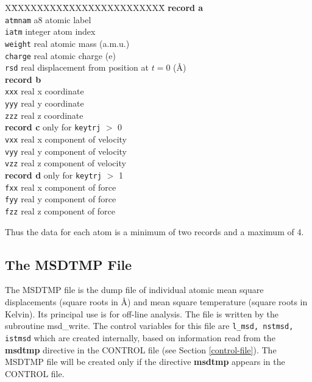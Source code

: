 \begin{tabbing}
X\=XXXXXXXX\=XXXXXXXXXXXXXXXX\=\kill
{\bf record a} \\
\> {\tt atmnam} \> a8      \> atomic label \\
\> {\tt iatm}   \> integer \> atom index \\
\> {\tt weight} \> real    \> atomic mass (a.m.u.) \\
\> {\tt charge} \> real    \> atomic charge (e) \\
\> {\tt rsd}    \> real    \> displacement from position at $t=0$ (\AA)\\
{\bf record b} \\
\> {\tt xxx}    \> real    \> x coordinate \\
\> {\tt yyy}    \> real    \> y coordinate \\
\> {\tt zzz}    \> real    \> z coordinate \\
{\bf record c} only for {\tt keytrj} $>$ 0 \\
\> {\tt vxx}    \> real    \> x component of velocity \\
\> {\tt vyy}    \> real    \> y component of velocity \\
\> {\tt vzz}    \> real    \> z component of velocity \\
{\bf record d} only for {\tt keytrj} $>$ 1 \\
\> {\tt fxx}    \> real    \> x component of force \\
\> {\tt fyy}    \> real    \> y component of force \\
\> {\tt fzz}    \> real    \> z component of force \\
\end{tabbing}
Thus the data for each atom is a minimum of two records and a maximum
of 4.

\subsection{The MSDTMP File}
\label{msdtmp-file}

The MSDTMP file is the dump file of individual atomic mean square
displacements (square roots in \AA) and mean square temperature
(square roots in Kelvin).  Its principal use is for off-line analysis.
The file is written by the subroutine {\sc msd\_write}.  The control
variables for this file are {\tt l\_msd, nstmsd, istmsd} which are
created internally, based on information read from the {\bf msdtmp}
directive in the CONTROL file (see Section \ref{control-file}).
The MSDTMP file will be created only if the directive {\bf msdtmp}
appears in the CONTROL file.

